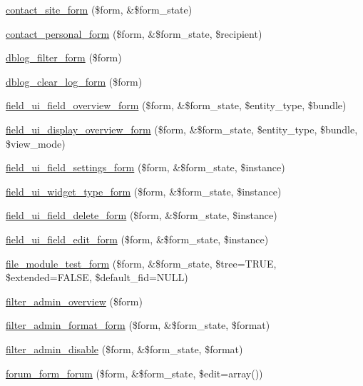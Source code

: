 \begin{DoxyCompactItemize}
\hyperlink{group__forms_gabc4466031f99ab64b6b65e4fdbf4291d}{contact\_\-site\_\-form} (\$form, \&\$form\_\-state)
\item 
\hyperlink{group__forms_ga7dfdb8ed0a4456f0f2070b6efd64f280}{contact\_\-personal\_\-form} (\$form, \&\$form\_\-state, \$recipient)
\item 
\hyperlink{group__forms_ga1baa51b833eb4a3831b4319d4c20ad19}{dblog\_\-filter\_\-form} (\$form)
\item 
\hyperlink{group__forms_gad4ec60fb6fd40f5ae8691709f2b9affb}{dblog\_\-clear\_\-log\_\-form} (\$form)
\item 
\hyperlink{group__forms_gad62638f853fe251696eb3b57e8111845}{field\_\-ui\_\-field\_\-overview\_\-form} (\$form, \&\$form\_\-state, \$entity\_\-type, \$bundle)
\item 
\hyperlink{group__forms_gad03c0a01179bc9ebb22b5c35784e1abf}{field\_\-ui\_\-display\_\-overview\_\-form} (\$form, \&\$form\_\-state, \$entity\_\-type, \$bundle, \$view\_\-mode)
\item 
\hyperlink{group__forms_gaf347f488d97997991b92aae7060a10f2}{field\_\-ui\_\-field\_\-settings\_\-form} (\$form, \&\$form\_\-state, \$instance)
\item 
\hyperlink{group__forms_ga4dda66fe912ff3d86613df64b4a940e0}{field\_\-ui\_\-widget\_\-type\_\-form} (\$form, \&\$form\_\-state, \$instance)
\item 
\hyperlink{group__forms_gaaf4ce327f76bcd961e5de338558e704e}{field\_\-ui\_\-field\_\-delete\_\-form} (\$form, \&\$form\_\-state, \$instance)
\item 
\hyperlink{group__forms_ga11660e91b3649ff30bf665c00f1a9af2}{field\_\-ui\_\-field\_\-edit\_\-form} (\$form, \&\$form\_\-state, \$instance)
\item 
\hyperlink{group__forms_ga213f4f5000c3130fa6cd33969c25034e}{file\_\-module\_\-test\_\-form} (\$form, \&\$form\_\-state, \$tree=TRUE, \$extended=FALSE, \$default\_\-fid=NULL)
\item 
\hyperlink{group__forms_ga3fc30971380683ced638edbd19d1390c}{filter\_\-admin\_\-overview} (\$form)
\item 
\hyperlink{group__forms_ga8f289105b56a610a4aac171301a2371b}{filter\_\-admin\_\-format\_\-form} (\$form, \&\$form\_\-state, \$format)
\item 
\hyperlink{group__forms_ga425ee204872a718d5b49c40acce75b69}{filter\_\-admin\_\-disable} (\$form, \&\$form\_\-state, \$format)
\item 
\hyperlink{group__forms_ga74d0d5997a52e44a382cd6792b8718dc}{forum\_\-form\_\-forum} (\$form, \&\$form\_\-state, \$edit=array())

\end{DoxyCompactItemize}
